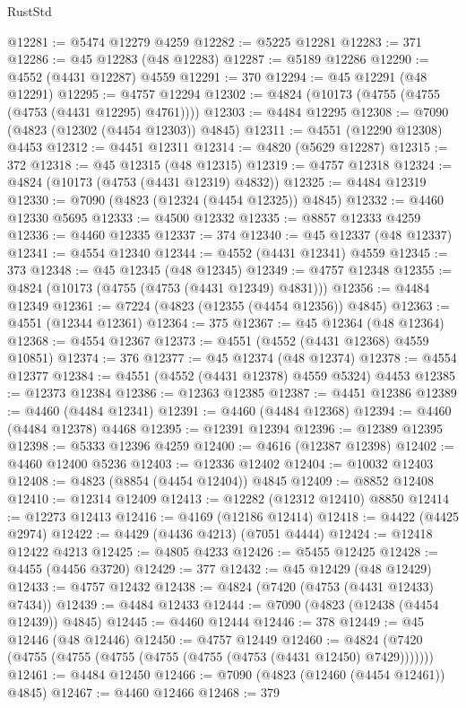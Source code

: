 \begin{lexlean}{RustStd}
\begin{coremodule}
@12281 := @5474 @12279 @4259
@12282 := @5225 @12281
@12283 := 371
@12286 := @45 @12283 (@48 @12283)
@12287 := @5189 @12286
@12290 := @4552 (@4431 @12287) @4559
@12291 := 370
@12294 := @45 @12291 (@48 @12291)
@12295 := @4757 @12294
@12302 := @4824 (@10173 (@4755 (@4755 (@4753 (@4431 @12295) @4761))))
@12303 := @4484 @12295
@12308 := @7090 (@4823 (@12302 (@4454 @12303)) @4845)
@12311 := @4551 (@12290 @12308) @4453
@12312 := @4451 @12311
@12314 := @4820 (@5629 @12287)
@12315 := 372
@12318 := @45 @12315 (@48 @12315)
@12319 := @4757 @12318
@12324 := @4824 (@10173 (@4753 (@4431 @12319) @4832))
@12325 := @4484 @12319
@12330 := @7090 (@4823 (@12324 (@4454 @12325)) @4845)
@12332 := @4460 @12330 @5695
@12333 := @4500 @12332
@12335 := @8857 @12333 @4259
@12336 := @4460 @12335
@12337 := 374
@12340 := @45 @12337 (@48 @12337)
@12341 := @4554 @12340
@12344 := @4552 (@4431 @12341) @4559
@12345 := 373
@12348 := @45 @12345 (@48 @12345)
@12349 := @4757 @12348
@12355 := @4824 (@10173 (@4755 (@4753 (@4431 @12349) @4831)))
@12356 := @4484 @12349
@12361 := @7224 (@4823 (@12355 (@4454 @12356)) @4845)
@12363 := @4551 (@12344 @12361)
@12364 := 375
@12367 := @45 @12364 (@48 @12364)
@12368 := @4554 @12367
@12373 := @4551 (@4552 (@4431 @12368) @4559 @10851)
@12374 := 376
@12377 := @45 @12374 (@48 @12374)
@12378 := @4554 @12377
@12384 := @4551 (@4552 (@4431 @12378) @4559 @5324) @4453
@12385 := @12373 @12384
@12386 := @12363 @12385
@12387 := @4451 @12386
@12389 := @4460 (@4484 @12341)
@12391 := @4460 (@4484 @12368)
@12394 := @4460 (@4484 @12378) @4468
@12395 := @12391 @12394
@12396 := @12389 @12395
@12398 := @5333 @12396 @4259
@12400 := @4616 (@12387 @12398)
@12402 := @4460 @12400 @5236
@12403 := @12336 @12402
@12404 := @10032 @12403
@12408 := @4823 (@8854 (@4454 @12404)) @4845
@12409 := @8852 @12408
@12410 := @12314 @12409
@12413 := @12282 (@12312 @12410) @8850
@12414 := @12273 @12413
@12416 := @4169 (@12186 @12414)
@12418 := @4422 (@4425 @2974)
@12422 := @4429 (@4436 @4213) (@7051 @4444)
@12424 := @12418 @12422 @4213
@12425 := @4805 @4233
@12426 := @5455 @12425
@12428 := @4455 (@4456 @3720)
@12429 := 377
@12432 := @45 @12429 (@48 @12429)
@12433 := @4757 @12432
@12438 := @4824 (@7420 (@4753 (@4431 @12433) @7434))
@12439 := @4484 @12433
@12444 := @7090 (@4823 (@12438 (@4454 @12439)) @4845)
@12445 := @4460 @12444
@12446 := 378
@12449 := @45 @12446 (@48 @12446)
@12450 := @4757 @12449
@12460 := @4824 (@7420 (@4755 (@4755 (@4755 (@4755 (@4755 (@4753 (@4431 @12450) @7429)))))))
@12461 := @4484 @12450
@12466 := @7090 (@4823 (@12460 (@4454 @12461)) @4845)
@12467 := @4460 @12466
@12468 := 379

\end{coremodule}
\end{lexlean}
